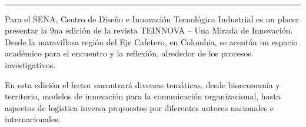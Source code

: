 \documentclass{article}
\begin{document}
\begin{textblock*}{68mm}
{\begin{minipage}[t]{68mm}
{\href{https://www.facebook.com/sharer/sharer.php?u=https%3A%2F%2Fwww.dropbox.com%2Fscl%2Ffi%2From8ermbyet1p606ms6y0%2Fl-01-EDITORIAL.pdf%3Frlkey%3Dx341kromqoa6a1fyx499z5yj2%26st%3Dmknhry7g%26dl%3D1}{}~
\href{https://www.linkedin.com/sharing/share-offsite/?url=https%3A%2F%2Fwww.dropbox.com%2Fscl%2Ffi%2From8ermbyet1p606ms6y0%2Fl-01-EDITORIAL.pdf%3Frlkey%3Dx341kromqoa6a1fyx499z5yj2%26st%3Dmknhry7g%26dl%3D1}{}~
\href{https://www.reddit.com/submit?url=https%3A%2F%2Fwww.dropbox.com%2Fscl%2Ffi%2From8ermbyet1p606ms6y0%2Fl-01-EDITORIAL.pdf%3Frlkey%3Dx341kromqoa6a1fyx499z5yj2%26st%3Dmknhry7g%26dl%3D1&title=Editorial}{}~
\href{https://www.researchgate.net/search?q=Editorial}{}~
\href{https://t.me/share/url?url=https%3A%2F%2Fwww.dropbox.com%2Fscl%2Ffi%2From8ermbyet1p606ms6y0%2Fl-01-EDITORIAL.pdf%3Frlkey%3Dx341kromqoa6a1fyx499z5yj2%26st%3Dmknhry7g%26dl%3D1&text=Editorial}{}~
\href{https://wa.me/?text=https%3A%2F%2Fwww.dropbox.com%2Fscl%2Ffi%2From8ermbyet1p606ms6y0%2Fl-01-EDITORIAL.pdf%3Frlkey%3Dx341kromqoa6a1fyx499z5yj2%26st%3Dmknhry7g%26dl%3D1}{}~
\href{https://twitter.com/intent/tweet?url=https%3A%2F%2Fwww.dropbox.com%2Fscl%2Ffi%2From8ermbyet1p606ms6y0%2Fl-01-EDITORIAL.pdf%3Frlkey%3Dx341kromqoa6a1fyx499z5yj2%26st%3Dmknhry7g%26dl%3D1&text=Editorial}{}
}\par
\end{minipage}%
}%
\end{textblock*}


\bigskip
\noindent\rule{\linewidth}{0.4pt}
\bigskip

Para el SENA, Centro de Diseño e Innovación Tecnológica Industrial es un placer presentar la 9na edición de la revista TEINNOVA – Una Mirada de Innovación. Desde la maravillosa región del Eje Cafetero, en Colombia, se acentúa un espacio académico para el encuentro y la reflexión, alrededor de los procesos investigativos.

En esta edición el lector encontrará diversas temáticas, desde bioeconomía y territorio, modelos de innovación para la comunicación organizacional, hasta aspectos de logística inversa propuestos por diferentes autores nacionales e internacionales.
\end{document}

